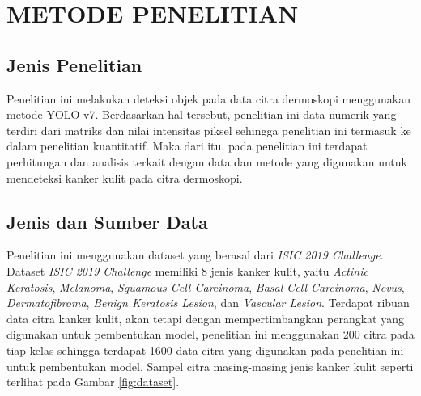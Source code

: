 \chapter{METODE PENELITIAN}

\section{Jenis Penelitian}
Penelitian ini melakukan deteksi objek pada data citra dermoskopi menggunakan metode YOLO-v7. Berdasarkan hal tersebut, penelitian ini data numerik yang terdiri dari matriks dan nilai intensitas piksel sehingga penelitian ini termasuk ke dalam penelitian kuantitatif. Maka dari itu, pada penelitian ini terdapat perhitungan dan analisis terkait dengan data dan metode yang digunakan untuk mendeteksi kanker kulit pada citra dermoskopi.

\section{Jenis dan Sumber Data}
Penelitian ini menggunakan dataset yang berasal dari \textit{ISIC 2019 Challenge}. Dataset \textit{ISIC 2019 Challenge} memiliki 8 jenis kanker kulit, yaitu \textit{Actinic Keratosis}, \textit{Melanoma}, \textit{Squamous Cell Carcinoma}, \textit{Basal Cell Carcinoma}, \textit{Nevus}, \textit{Dermatofibroma}, \textit{Benign Keratosis Lesion}, dan \textit{Vascular Lesion}. Terdapat ribuan data citra kanker kulit, akan tetapi dengan mempertimbangkan perangkat yang digunakan untuk pembentukan model, penelitian ini menggunakan 200 citra pada tiap kelas sehingga terdapat 1600 data citra yang digunakan pada penelitian ini untuk pembentukan model. Sampel citra masing-masing jenis kanker kulit seperti terlihat pada Gambar \ref{fig:dataset}.

